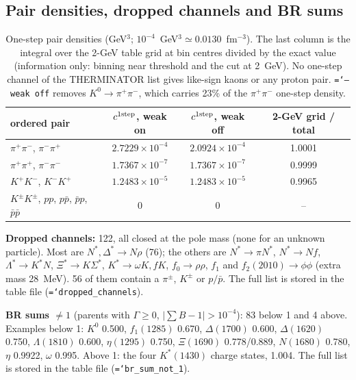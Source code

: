\documentclass[11pt,a4paper]{article}
\newcommand{\code}[1]{\texttt{\hyphenchar\font=`\-#1}}
\begin{document}
\subsection{Pair densities, dropped channels and BR sums}

\begin{table}[h]
\centering\small
\begin{tabular}{lccc}
\toprule
ordered pair & $c^{\rm 1step}$, weak on & $c^{\rm 1step}$, weak off & 2-GeV grid / total \\
\midrule
$\pi^+\pi^-$, $\pi^-\pi^+$ & $2.7229\times10^{-4}$ & $2.0924\times10^{-4}$ & 1.0001 \\
$\pi^+\pi^+$, $\pi^-\pi^-$ & $1.7367\times10^{-7}$ & $1.7367\times10^{-7}$ & 0.9999 \\
$K^+K^-$, $K^-K^+$         & $1.2483\times10^{-5}$ & $1.2483\times10^{-5}$ & 0.9965 \\
$K^\pm K^\pm$, $p p$, $p\bar p$, $\bar p p$, $\bar p\bar p$ & 0 & 0 & -- \\
\bottomrule
\end{tabular}
\caption{One-step pair densities (GeV$^3$; $10^{-4}$~GeV$^3\simeq0.0130$~fm$^{-3}$). The last
column is the integral over the 2-GeV table grid at bin centres divided by the exact value
(information only: binning near threshold and the cut at 2~GeV). No one-step channel of the
THERMINATOR list gives like-sign kaons or any proton pair. \code{--weak off} removes
$K^0\to\pi^+\pi^-$, which carries 23\% of the $\pi^+\pi^-$ one-step density.}
\end{table}

\noindent\textbf{Dropped channels:} 122, all closed at the pole mass (none for an unknown
particle). Most are $N^*,\Delta^*\to N\rho$ (76); the others are $N^*\to\pi N^*$, $N^*\to Nf$,
$\Lambda^*\to K^*N$, $\Xi^*\to K\Sigma^*$, $K^*\to\omega K, fK$, $f_0\to\rho\rho$, $f_1$ and
$f_2(2010)\to\phi\phi$ (extra mass 28~MeV). 56 of them contain a $\pi^\pm$, $K^\pm$ or $p/\bar p$. The full list is stored in the table file (\code{dropped\_channels}).

\noindent\textbf{BR sums $\ne1$} (parents with $\Gamma\ge0$, $|\sum B-1|>10^{-4}$): 83 below 1 and 4
above. Examples below 1: $K^0$ 0.500, $f_1(1285)$ 0.670, $\Delta(1700)$ 0.600, $\Delta(1620)$
0.750, $\Lambda(1810)$ 0.600, $\eta(1295)$ 0.750, $\Xi(1690)$ 0.778/0.889, $N(1680)$ 0.780,
$\eta$ 0.9922, $\omega$ 0.995. Above 1: the four $K^*(1430)$ charge states, 1.004. The full list is
stored in the table file (\code{br\_sum\_not\_1}).
\end{document}
